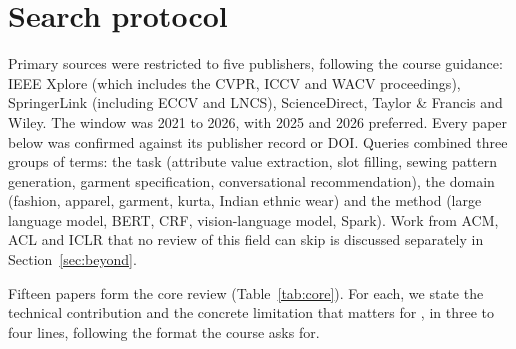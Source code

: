 \section{Search protocol}

Primary sources were restricted to five publishers, following the course guidance: IEEE Xplore (which includes the CVPR, ICCV and WACV proceedings), SpringerLink (including ECCV and LNCS), ScienceDirect, Taylor \& Francis and Wiley. The window was 2021 to 2026, with 2025 and 2026 preferred. Every paper below was confirmed against its publisher record or DOI. Queries combined three groups of terms: the task (attribute value extraction, slot filling, sewing pattern generation, garment specification, conversational recommendation), the domain (fashion, apparel, garment, kurta, Indian ethnic wear) and the method (large language model, BERT, CRF, vision-language model, Spark). Work from ACM, ACL and ICLR that no review of this field can skip is discussed separately in Section~\ref{sec:beyond}.

Fifteen papers form the core review (Table~\ref{tab:core}). For each, we state the technical contribution and the concrete limitation that matters for \sys{}, in three to four lines, following the format the course asks for.

